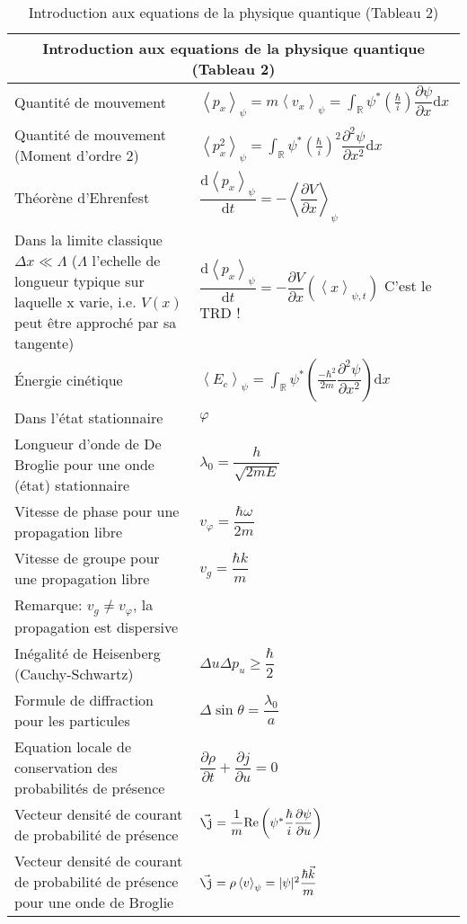 \documentclass[10pt,a4paper,titlepage,landscape]{article}
\renewcommand{\d}
{
    \mathrm{d}
}
\newcommand*{\dv}[2]
{
    \dfrac{\d#1}{\d#2}
}
\newcommand*{\dpv}[2]
{
    \dfrac{\partial#1}{\partial#2}
}
\newcommand*{\ddpv}[2]
{
    \dfrac{\partial^2#1}{\partial{#2}^2}
}
\renewcommand{\arraystretch}{2}
\newcommand{\av}[2]
{
    \left\langle#1\right\rangle_{#2}
}
\newcommand{\rint}
{
    \int_{\mathbb{R}}
}
\begin{document}
\newpage 
\begin{table}[H]
    \centering
    \renewcommand{\arraystretch}{1.5} %
    \setlength{\tabcolsep}{8pt} %
    \begin{tabular}{@{}|p{9cm}|p{10cm}@{}|}

        \multicolumn{2}{c}{\textbf{Introduction aux equations de la physique quantique (Tableau 2)}} \\ \hline


    Quantité de mouvement & $\displaystyle \av{p_x}{\psi}=m\av{v_x}{\psi}=\rint \psi^* \left(\frac{\hbar}{i}\right) \dpv{\psi}{x}\d x$ \\ \hline 
    Quantité de mouvement (Moment d'ordre 2) & $\displaystyle \av{p_x^2}{\psi}=\rint \psi^* \left(\frac{\hbar}{i}\right)^2 \ddpv{\psi}{x}\d x$ \\ \hline
    Théorène d'Ehrenfest & $\dv{\av{p_x}{\psi}}{t} = -\av{\dpv{V}{x}}{\psi}$ \\ \hline
    Dans la limite classique $\Delta x \ll \Lambda $ ($\Lambda$ l'echelle de longueur typique sur laquelle x varie, i.e. $V(x)$ peut être approché par sa tangente) & $\dv{\av{p_x}{\psi}}{t} = -\dpv{V}{x} \left(\av{x}{\psi, t}\right)$ C'est le TRD ! \\ \hline
    Énergie cinétique & $\displaystyle \av{E_c}{\psi} = \rint \psi^* \left(\frac{-\hbar^2}{2m}\ddpv{\psi}{x}\right) \d x $\\ \hline
    Dans l'état stationnaire & $\varphi $ \\ \hline
    Longueur d'onde de De Broglie pour une onde (état) stationnaire & $\lambda_0 = \dfrac{h}{\sqrt{2mE}}$ \\ \hline

    Vitesse de phase pour une propagation libre & $v_{\varphi} = \dfrac{\hbar \omega}{2m}$ \\ \hline
    Vitesse de groupe pour une propagation libre & $v_g = \dfrac{\hbar k}{m}$ \\ \hline
    Remarque: $v_g \neq v_\varphi$, la propagation est dispersive & \\ \hline 
    Inégalité de Heisenberg (Cauchy-Schwartz) & $\Delta u \Delta p_u \geqslant \dfrac{\hbar}{2}$ \\ \hline
    Formule de diffraction pour les particules & $\Delta \sin\theta = \dfrac{\lambda_0}{a}$ \\ \hline
    Equation locale de conservation des probabilités de présence & $\dpv{\rho}{t} + \dpv{j}{u} = 0 $ \\ \hline
    Vecteur densité de courant de probabilité de présence & $\vec {\j} = \dfrac{1}{m}\mathrm{Re}\left(\psi^*\dfrac{\hbar}{i} \dpv{\psi}{u} \right)$ \\ \hline
    Vecteur densité de courant de probabilité de présence pour une onde de Broglie & $\vec {\j} = \rho \av{v}{\psi} = |\psi|^2 \dfrac{\hbar \vec k}{m}$ \\ \hline

\end{tabular}
\caption{Introduction aux equations de la physique quantique (Tableau 2)}
\label{tab:quantphis}
\end{table}
\end{document}

